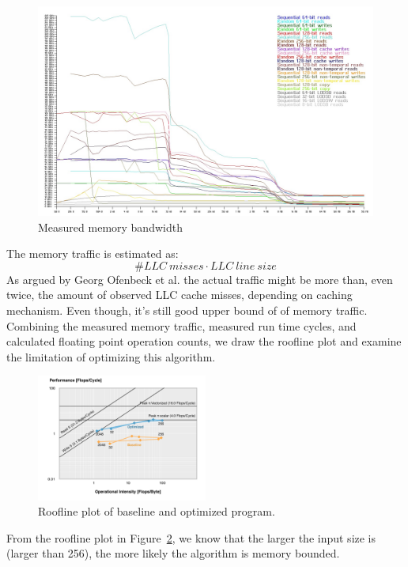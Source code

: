\begin{figure}
\centering
\includegraphics[scale=0.18]{./pic/bandwidth.jpg}
\caption{Measured memory bandwidth}
\label{fig:mem-bw}
\end{figure}

The memory traffic is estimated as: 
$$
\# LLC\ misses \cdot LLC\ line\ size
$$
As argued by Georg Ofenbeck et al.\cite{ofenbeck2014applying} the actual traffic might be more than, even twice, the amount of observed LLC cache misses, depending on caching mechanism. Even though, it's still good upper bound of of memory traffic. Combining the measured memory traffic, measured run time cycles, and calculated floating point operation counts, we draw the roofline plot and examine the limitation of optimizing this algorithm.

\begin{figure}[h]
\centering
\includegraphics[width=0.5\textwidth]{./pic/roofline.png}
\caption{Roofline plot of baseline and optimized program.}
\label{fig:roofline}
\end{figure}

From the roofline plot in Figure~\ref{fig:roofline}, we know that the larger the input size is (larger than 256), the more likely the algorithm is memory bounded.





